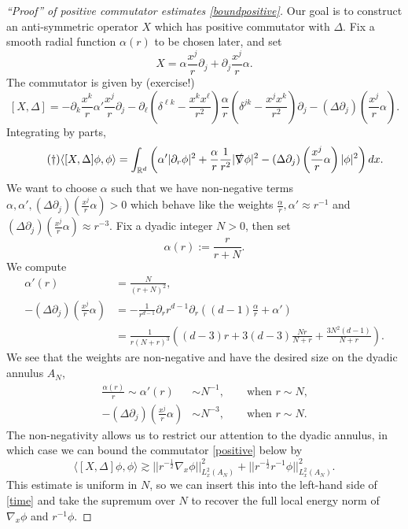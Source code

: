 \begin{proof}[``Proof'' of positive commutator estimates \eqref{boundpositive}]
	Our goal is to construct an anti-symmetric operator $X$ which has positive commutator with $\Delta$. Fix a smooth radial function $\alpha(r)$ to be chosen later, and set 
	\[
		X = \alpha \frac{x^j}{r} \partial_j + \partial_j \frac{x^j}{r} \alpha. 
	\]
The commutator is given by (exercise!)
	\[
		[X, \Delta] = -  \partial_k \frac{x^k}r \alpha' \frac{x^j}{r} \partial_j -  \partial_\ell \left( \delta^{\ell k} - \frac{x^k x^\ell}{r^2} \right) \frac{\alpha}{r} \left( \delta^{jk} - \frac{x^j x^k}{r^2} \right) \partial_j - (\Delta \partial_j) \left( \frac{x^j}{r} \alpha \right).
	\]
Integrating by parts, 
	\begin{equation}\label{eq:positive}\tag{$\dagger$}
		\langle [X, \Delta] \phi, \phi \rangle 
			=  \int_{\mathbb R^d} \left(   \alpha' |\partial_r \phi|^2 + \frac{\alpha}{r} \frac{1}{r^2} |\slashed \nabla \phi|^2 -  (\Delta \partial_j) \left( \frac{x^j}{r} \alpha \right) |\phi|^2 \right) dx. 
	\end{equation}
We want to choose $\alpha$ such that we have non-negative terms $\alpha, \alpha', (\Delta \partial_j) (\tfrac{x^j}{r} \alpha) > 0$ which behave like the weights $\tfrac{\alpha}{r}, \alpha' \approx r^{-1}$ and $(\Delta \partial_j) (\tfrac{x^j}{r} \alpha)  \approx r^{-3}$. Fix a dyadic integer $N > 0$, then set
	\[
		\alpha(r) := \frac{r}{r + N}. 
	\]
We compute	
	\begin{align*}
		\alpha'(r)
			&= \frac{N}{(r + N)^2},\\
		-(\Delta \partial_j) \left( \frac{x^j}{r} \alpha \right)	
			&= -\frac{1}{r^{d - 1}} \partial_r r^{d - 1} \partial_r \left( (d - 1) \frac{\alpha}{r} + \alpha' \right) \\
			&= \frac{1}{r (N + r)^3} \left(  (d - 3) r + 3(d - 3) \frac{Nr}{N + r} + \frac{3 N^2 (d - 1)}{N + r} \right).
	\end{align*}
We see that the weights are non-negative and have the desired size on the dyadic annulus $A_N$, 
	\begin{align*}
		\frac{\alpha(r)}{r}  \sim \alpha'(r)
			&\sim N^{-1}, \qquad \text{when $r \sim N$,}\\
		-(\Delta \partial_j) \left( \frac{x^j}{r} \alpha \right)	
			&\sim N^{-3},  \qquad \text{when $r \sim N$}.
	\end{align*}
The non-negativity allows us to restrict our attention to the dyadic annulus, in which case we can bound the commutator \eqref{positive} below by 
	\[
		\langle [X, \Delta] \phi, \phi \rangle \gtrsim || r^{-\frac12} \nabla_x \phi||_{L^2_x (A_N)}^2 +|| r^{-\frac12} r^{-1}  \phi||_{L^2_x (A_N)}^2.
	\]
	This estimate is uniform in $N$, so we can insert this into the left-hand side of \eqref{time} and take the supremum over $N$ to recover the full local energy norm of $\nabla_x \phi$ and $r^{-1} \phi$. 
\end{proof}

